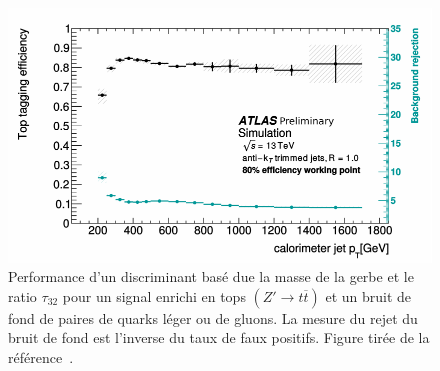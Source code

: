 \begin{figure}[h]
  \centering
  \includegraphics{tagging.pdf}
  \caption{Performance d'un discriminant basé due la masse de la gerbe
    et le ratio $\tau_{32}$ pour un signal enrichi en tops
    $(Z' \rightarrow t\overline{t})$ et un bruit de fond de paires de
    quarks léger ou de gluons. La mesure du rejet du bruit de fond est
    l'inverse du taux de faux positifs. Figure tirée de la
    référence~\cite{_boosted_2015}.}
\label{fig:tagging}
\end{figure}






